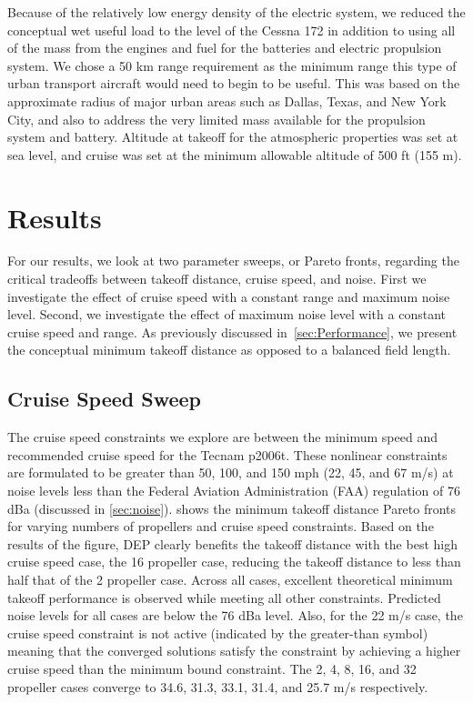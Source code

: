 \documentclass[conf]{new-aiaa}
\begin{document}
Because of the relatively low energy density of the electric system, we reduced the conceptual wet useful load to the level of the Cessna 172 in addition to using all of the mass from the engines and fuel for the batteries and electric propulsion system. We chose a 50 km range requirement as the minimum range this type of urban transport aircraft would need to begin to be useful. This was based on the approximate radius of major urban areas such as Dallas, Texas, and New York City, and also to address the very limited mass available for the propulsion system and battery. Altitude at takeoff for the atmospheric properties was set at sea level, and cruise was set at the minimum allowable altitude of 500 ft (155 m).




\section{Results}
\label{chp:Results}


For our results, we look at two parameter sweeps, or Pareto fronts, regarding the critical tradeoffs between takeoff distance, cruise speed, and noise. First we investigate the effect of cruise speed with a constant range and maximum noise level. Second, we investigate the effect of maximum noise level with a constant cruise speed and range. As previously discussed in~\cref{sec:Performance}, we present the conceptual minimum takeoff distance as opposed to a balanced field length.

\subsection{Cruise Speed Sweep}

\label{CruiseSpeedSweep}

The cruise speed constraints we explore are between the minimum speed and recommended cruise speed for the Tecnam p2006t. These nonlinear constraints are formulated to be greater than 50, 100, and 150 mph (22, 45, and 67 m/s) at noise levels less than the Federal Aviation Administration (FAA) regulation of 76 dBa (discussed in \cref{sec:noise}).  shows the minimum takeoff distance Pareto fronts for varying numbers of propellers and cruise speed constraints. Based on the results of the figure, DEP clearly benefits the takeoff distance with the best high cruise speed case, the 16 propeller case, reducing the takeoff distance to less than half that of the 2 propeller case. Across all cases, excellent theoretical minimum takeoff performance is observed while meeting all other constraints. Predicted noise levels for all cases are below the 76 dBa level. Also, for the 22 m/s case, the cruise speed constraint is not active (indicated by the greater-than symbol) meaning that the converged solutions satisfy the constraint by achieving a higher cruise speed than the minimum bound constraint. The 2, 4, 8, 16, and 32 propeller cases converge to 34.6, 31.3, 33.1, 31.4, and 25.7 m/s respectively.
\end{document}
